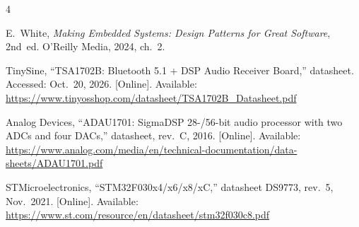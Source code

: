 \documentclass[conference]{IEEEtran}
\begin{document}
\begin{thebibliography}{4}

E.~White, \emph{Making Embedded Systems: Design Patterns for Great
Software}, 2nd~ed. O'Reilly Media, 2024, ch.~2.

TinySine, \textquotedblleft{}TSA1702B: Bluetooth 5.1 + DSP Audio Receiver
Board,\textquotedblright{} datasheet. Accessed: Oct.~20, 2026.
[Online]. Available:
\url{https://www.tinyosshop.com/datasheet/TSA1702B_Datasheet.pdf}

Analog Devices, \textquotedblleft{}ADAU1701: SigmaDSP 28-/56-bit audio
processor with two ADCs and four DACs,\textquotedblright{} datasheet,
rev.~C, 2016. [Online]. Available:
\url{https://www.analog.com/media/en/technical-documentation/data-sheets/ADAU1701.pdf}

STMicroelectronics, \textquotedblleft{}STM32F030x4/x6/x8/xC,\textquotedblright{}
datasheet DS9773, rev.~5, Nov.~2021. [Online]. Available:
\url{https://www.st.com/resource/en/datasheet/stm32f030c8.pdf}

\end{thebibliography}
\end{document}
